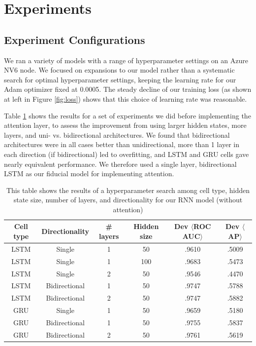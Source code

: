 \documentclass{article} %
\begin{document}
\section{Experiments}

\subsection{Experiment Configurations}

We ran a variety of models with a range of hyperparameter settings on an Azure NV6 node. We focused on expansions to our model rather than a systematic search for optimal hyperparameter settings, keeping the learning rate for our Adam optimizer \cite{adam} fixed at 0.0005. The steady decline of our training loss (as shown at left in Figure \ref{fig:loss}) shows that this choice of learning rate was reasonable.

Table \ref{tab:expts} shows the results for a set of experiments we did before implementing the attention layer, to assess the improvement from using larger hidden states, more layers, and uni- vs. bidirectional architectures. We found that bidirectional architectures were in all cases better than unidirectional, more than 1 layer in each direction (if bidirectional) led to overfitting, and LSTM and GRU cells gave nearly equivalent performance. We therefore used a single layer, bidirectional LSTM as our fiducial model for implementing attention.

\begin{table}[ht]
\begin{center}
	\begin{tabular}{|c|c|c|c|c|c|}
	\hline
	Cell type & Directionality & \# layers & Hidden size & Dev $\langle$ROC AUC$\rangle$ & Dev $\langle$AP$\rangle$ \\
	\hline
    LSTM & Single & 1 & 50 & .9610 & .5009 \\
    LSTM & Single & 1 & 100 & .9683 & .5473 \\
    LSTM & Single & 2 & 50 & .9546 & .4470 \\
    LSTM & Bidirectional & 1 & 50 & .9747 & .5788 \\
    LSTM & Bidirectional & 2 & 50 & .9747 & .5882 \\
    GRU & Single & 1 & 50 & .9659 & .5180 \\
    GRU & Bidirectional & 1 & 50 & .9755 & .5837 \\
    GRU & Bidirectional & 2 & 50 & .9761 & .5619 \\
	\hline
	\end{tabular}
\end{center}
\caption{This table shows the results of a hyperparameter search among cell type, hidden state size, number of layers, and directionality for our RNN model (without attention)}
\label{tab:expts}
\end{table}
\end{document}
